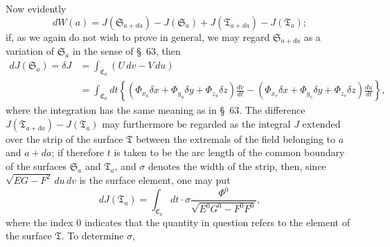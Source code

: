 \documentclass[11pt,a4paper,leqno]{article}
\begin{document}
Now evidently
\begin{equation}\tag{47}
dW(a)=J(\mathfrak{S}_{a+da})-J(\mathfrak{S}_a)
     +J(\mathfrak{T}_{a+da})-J(\mathfrak{T}_a);
\end{equation}
if, as we again do not wish to prove in general, we may regard
$\mathfrak{S}_{a+da}$ as a variation of $\mathfrak{S}_a$ in the sense of
\S~63, then
\[
\begin{aligned}
dJ(\mathfrak{S}_a)=\delta J
&=\int_{\mathfrak{C}_a}(U\,dv-V\,du)\\
&=\int_{\mathfrak{C}_a}dt\left\{
(\Phi_{x_u}\delta x+\Phi_{y_u}\delta y+\Phi_{z_u}\delta z)\frac{dv}{dt}
-(\Phi_{x_v}\delta x+\Phi_{y_v}\delta y+\Phi_{z_v}\delta z)\frac{du}{dt}
\right\},
\end{aligned}
\]
where the integration has the same meaning as in \S~63. The difference
$J(\mathfrak{T}_{a+da})-J(\mathfrak{T}_a)$ may furthermore be regarded as
the integral $J$ extended over the strip of the surface $\mathfrak{T}$
between the extremals of the field belonging to $a$ and $a+da$; if therefore
$t$ is taken to be the arc length of the common boundary of the surfaces
$\mathfrak{S}_a$ and $\mathfrak{T}_a$, and $\sigma$ denotes the width of the
strip, then, since $\sqrt{EG-F^2}\,du\,dv$ is the surface element, one may put
\[
dJ(\mathfrak{T}_a)=\int_{\mathfrak{C}_a}dt\cdot\sigma
\frac{\Phi^0}{\sqrt{E^0G^0-F^0F^0}},
\]
where the index $0$ indicates that the quantity in question refers to the
element of the surface $\mathfrak{T}$. To determine $\sigma$,
\end{document}
